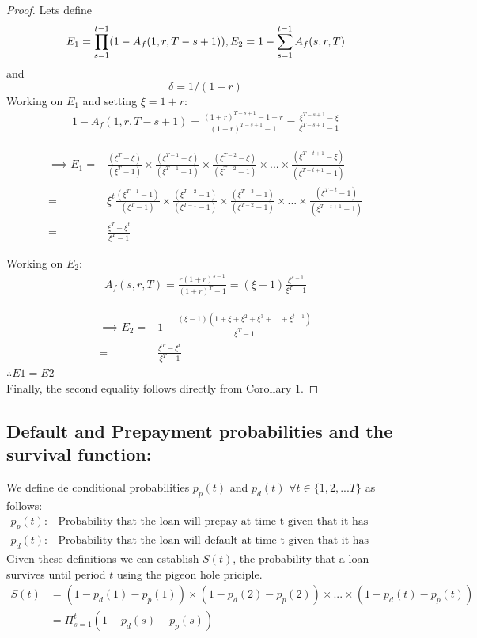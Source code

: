 \begin{proof}{}{} Lets define
\[
E_1=\prod^{t-1}_{s=1}(1-A_f(1,r,T-s+1)), \\
E_2 =1-\sum^{t-1}_{s=1}A_f(s,r,T)
\]
and
\[
\delta =1/(1+r)
\]
Working on $E_1$ and setting $\xi=1+r$:
\begin{align}
1-A_f(1,r,T-s+1) = \frac{(1+r)^{T-s+1}-1-r}{(1+r)^{T-s+1}-1}=\frac{\xi^{T-s+1}-\xi}{\xi^{T-s+1}-1} \nonumber
\end{align}

\begin{align}
\implies E_1 =& \frac{(\xi^T-\xi)}{(\xi^T-1)}\times \frac{(\xi^{T-1}-\xi)}{(\xi^{T-1}-1)} \times \frac{(\xi^{T-2}-\xi)}{(\xi^{T-2}-1)} \times ... \times \frac{(\xi^{T-t+1}-\xi)}{(\xi^{T-t+1}-1)} \nonumber\\
=&\xi^t \frac{(\xi^{T-1}-1)}{(\xi^T-1)}\times \frac{(\xi^{T-2}-1)}{(\xi^{T-1}-1)} \times \frac{(\xi^{T-3}-1)}{(\xi^{T-2}-1)} \times ... \times \frac{(\xi^{T-t}-1)}{(\xi^{T-t+1}-1)} \nonumber\\
=&\frac{\xi^T-\xi^t}{\xi^T-1} \label{eq:e1}
\end{align}

Working on $E_2$:
\begin{align}
A_f(s,r,T) = \frac{r(1+r)^{s-1}}{(1+r)^{T}-1}=(\xi-1)\frac{\xi^{s-1}}{\xi^{T}-1} \nonumber
\end{align}

\begin{align}
\implies E_2 =& 1-\frac{(\xi-1)(1+\xi+\xi^2+\xi^3+...+\xi^{t-1})}{\xi^T-1}\nonumber\\
=&\frac{\xi^T-\xi^t}{\xi^T-1} 
\end{align}
$\therefore E1=E2$\\
Finally, the second equality follows directly from Corollary 1.
\end{proof}

\subsection{Default and Prepayment probabilities and the survival function:}
We define de conditional probabilities $p_p(t)$ and $p_d(t)$ $\forall t \in \{1,2,...T\}$ as follows:
\begin{align}
   p_p(t)  :&  \mbox{
   Probability that the loan will prepay at time t given that it has survived to that point } \nonumber \\
   p_d(t)  : &  \mbox{
   Probability that the loan will default at time t given that it has survived to that point 
   } \nonumber
\end{align} \noindent
 Given these definitions we can establish $S(t)$, the probability that a loan survives until period $t$ using the pigeon hole priciple. 
\begin{align}
S(t) & = (1-p_d(1) - p_p(1))\times(1-p_d(2) - p_p(2))\times...\times(1-p_d(t) - p_p(t)) \nonumber\\ 
 & =  \Pi_{s=1}^t (1-p_d(s) - p_p(s))  
\end{align}



